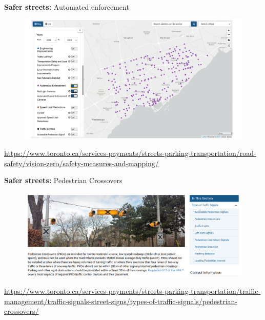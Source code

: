 \documentclass[aspectratio=169]{beamer}
\begin{document}
\begin{frame}
	
	\textbf{Safer streets:} Automated enforcement
	
	\begin{figure}
		\centering
		\includegraphics[width=0.75\linewidth]{images/automated_enforcement.png}
	\end{figure}
	
	\tiny\url{https://www.toronto.ca/services-payments/streets-parking-transportation/road-safety/vision-zero/safety-measures-and-mapping/}
	
\end{frame}






\begin{frame}
	
	\textbf{Safer streets:} Pedestrian Crossovers
	
	\begin{figure}
		\centering
		\includegraphics[width=1\linewidth]{images/pedestrian_pxo.png}
	\end{figure}
	
	\tiny\url{https://www.toronto.ca/services-payments/streets-parking-transportation/traffic-management/traffic-signals-street-signs/types-of-traffic-signals/pedestrian-crossovers/}
	
	
\end{frame}
\end{document}
